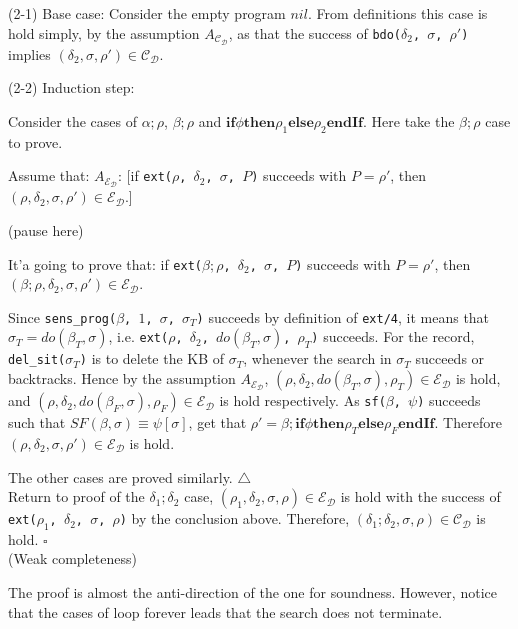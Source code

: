 \documentclass[letterpaper]{article}
\begin{document}
(2-1) Base case: Consider the empty program $nil$. From definitions this case is hold simply, by the assumption $A_\mathcal{C_D}$, as that the success of \texttt{bdo($\delta_2$, $\sigma$, $\rho'$)} implies $(\delta_2, \sigma, \rho')\in \mathcal{C_D}$.

(2-2) Induction step:

Consider the cases of $\alpha;\rho$, $\beta;\rho$ and $\textbf{if} \phi \textbf{then} \rho_1 \textbf{else} \rho_2 \textbf{endIf}$. Here take the $\beta;\rho$ case to prove.

Assume that: $A_\mathcal{E_D}$: [if \texttt{ext($\rho$, $\delta_2$, $\sigma$, $P$)} succeeds with $P=\rho'$, then $(\rho, \delta_2, \sigma, \rho')\in \mathcal{E_D}$.]

(pause here)

It'a going to prove that: if \texttt{ext($\beta;\rho$, $\delta_2$, $\sigma$, $P$)} succeeds with $P=\rho'$, then $(\beta;\rho, \delta_2, \sigma, \rho')\in \mathcal{E_D}$.

Since \texttt{sens\_prog($\beta$, $1$, $\sigma$, $\sigma_T$)} succeeds by definition of \texttt{ext/4}, it means that $\sigma_T=do(\beta_T,\sigma)$, i.e. \texttt{ext($\rho$, $\delta_2$, $do(\beta_T,\sigma)$, $\rho_T$)} succeeds. For the record, \texttt{del\_sit($\sigma_T$)} is to delete the KB of $\sigma_T$, whenever the search in $\sigma_T$ succeeds or backtracks. Hence by the assumption $A_\mathcal{E_D}$, $(\rho, \delta_2, do(\beta_T,\sigma), \rho_T)\in \mathcal{E_D}$ is hold, and $(\rho, \delta_2, do(\beta_F,\sigma), \rho_F)\in \mathcal{E_D}$ is hold respectively. As \texttt{sf($\beta$, $\psi$)} succeeds such that $SF(\beta, \sigma)\equiv\psi[\sigma]$, get that $\rho'=\beta;\textbf{if} \phi \textbf{then} \rho_T \textbf{else} \rho_F \textbf{endIf}$. Therefore $(\rho, \delta_2, \sigma, \rho')\in \mathcal{E_D}$ is hold.

The other cases are proved similarly.
$\bigtriangleup$
\\

Return to proof of the $\delta_1;\delta_2$ case, $(\rho_1, \delta_2, \sigma, \rho)\in \mathcal{E_D}$ is hold with the success of \texttt{ext($\rho_1$, $\delta_2$, $\sigma$, $\rho$)} by the conclusion above. Therefore, $(\delta_1;\delta_2, \sigma, \rho)\in \mathcal{C_D}$ is hold.
$\square$
\\

(Weak completeness)

The proof is almost the anti-direction of the one for soundness. However, notice that the cases of loop forever leads that the search does not terminate.
\end{document}
